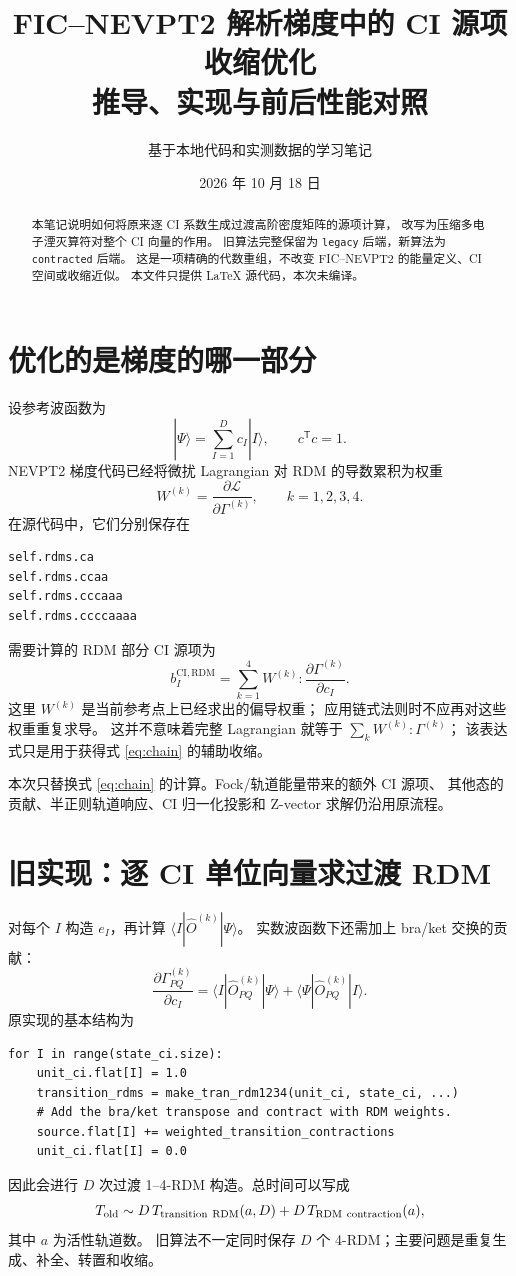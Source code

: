 \documentclass[UTF8,a4paper,11pt,fontset=fandol]{ctexart}
\title{FIC--NEVPT2 解析梯度中的 CI 源项收缩优化\\推导、实现与前后性能对照}
\author{基于本地代码和实测数据的学习笔记}
\date{2026 年 10 月 18 日}
\newcommand{\CI}{\mathrm{CI}}
\newcommand{\T}{\mathsf{T}}
\begin{document}
\maketitle
\begin{abstract}
本笔记说明如何将原来逐 CI 系数生成过渡高阶密度矩阵的源项计算，
改写为压缩多电子湮灭算符对整个 CI 向量的作用。
旧算法完整保留为 \texttt{legacy} 后端，新算法为 \texttt{contracted} 后端。
这是一项精确的代数重组，不改变 FIC--NEVPT2 的能量定义、CI 空间或收缩近似。
本文件只提供 LaTeX 源代码，本次未编译。
\end{abstract}
\tableofcontents

\section{优化的是梯度的哪一部分}
设参考波函数为
\[
 |\Psi\rangle=\sum_{I=1}^{D}c_I|I\rangle,\qquad c^\T c=1.
\]
NEVPT2 梯度代码已经将微扰 Lagrangian 对 RDM 的导数累积为权重
\[
 W^{(k)}=\frac{\partial\mathcal L}{\partial\Gamma^{(k)}},
 \qquad k=1,2,3,4.
\]
在源代码中，它们分别保存在
\begin{lstlisting}
self.rdms.ca
self.rdms.ccaa
self.rdms.cccaaa
self.rdms.ccccaaaa
\end{lstlisting}
需要计算的 RDM 部分 CI 源项为
\begin{equation}
 b_I^{\CI,\mathrm{RDM}}
 =\sum_{k=1}^4 W^{(k)}:
       \frac{\partial\Gamma^{(k)}}{\partial c_I}.
 \label{eq:chain}
\end{equation}
这里 $W^{(k)}$ 是当前参考点上已经求出的偏导权重；
应用链式法则时不应再对这些权重重复求导。
这并不意味着完整 Lagrangian 就等于 $\sum_k W^{(k)}:\Gamma^{(k)}$；
该表达式只是用于获得式 \eqref{eq:chain} 的辅助收缩。

本次只替换式 \eqref{eq:chain} 的计算。Fock/轨道能量带来的额外 CI 源项、
其他态的贡献、半正则轨道响应、CI 归一化投影和 Z-vector 求解仍沿用原流程。

\section{旧实现：逐 CI 单位向量求过渡 RDM}
对每个 $I$ 构造 $e_I$，再计算 $\langle I|\hat O^{(k)}|\Psi\rangle$。
实数波函数下还需加上 bra/ket 交换的贡献：
\[
 \frac{\partial\Gamma^{(k)}_{PQ}}{\partial c_I}
 =\langle I|\hat O^{(k)}_{PQ}|\Psi\rangle
  +\langle\Psi|\hat O^{(k)}_{PQ}|I\rangle.
\]
原实现的基本结构为
\begin{lstlisting}
for I in range(state_ci.size):
    unit_ci.flat[I] = 1.0
    transition_rdms = make_tran_rdm1234(unit_ci, state_ci, ...)
    # Add the bra/ket transpose and contract with RDM weights.
    source.flat[I] += weighted_transition_contractions
    unit_ci.flat[I] = 0.0
\end{lstlisting}
因此会进行 $D$ 次过渡 1--4-RDM 构造。总时间可以写成
\[
 T_{\rm old}\sim
 D\,T_{\rm transition\ RDM}(a,D)+D\,T_{\rm RDM\ contraction}(a),
\]
其中 $a$ 为活性轨道数。
旧算法不一定同时保存 $D$ 个 4-RDM；主要问题是重复生成、补全、转置和收缩。
\end{document}
